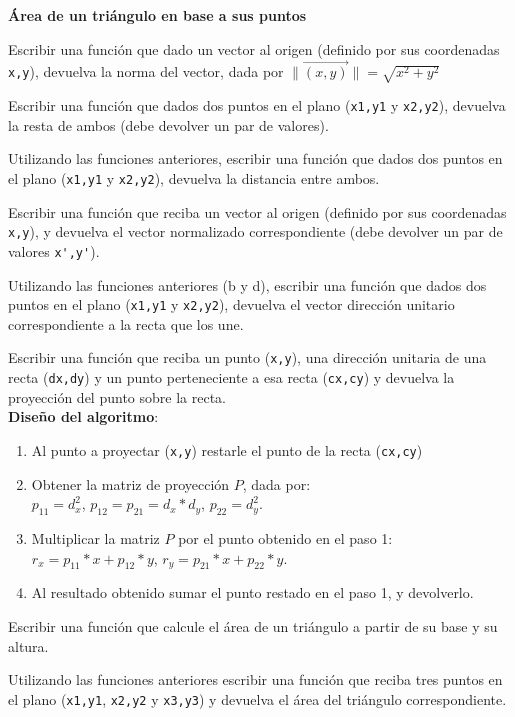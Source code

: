 \begin{ejercicio}
{\bf Área de un triángulo en base a sus puntos}
\begin{partes}

    \item Escribir una función que dado un vector al origen (definido por sus
 coordenadas \verb!x,y!), devuelva la norma del vector, dada por
 $\lVert\vec{(x,y)}\rVert=\sqrt{x^2+y^2}$

    \item Escribir una función que dados dos puntos en el plano (\verb!x1,y1! y
 \verb!x2,y2!), devuelva la resta de ambos (debe devolver un par de
 valores).

    \item Utilizando las funciones anteriores, escribir una función que dados dos
 puntos en el plano (\verb!x1,y1! y \verb!x2,y2!), devuelva la distancia
 entre ambos.

    \item Escribir una función que reciba un vector al origen (definido por sus
 coordenadas \verb!x,y!), y devuelva el vector normalizado correspondiente (debe
 devolver un par de valores \verb!x',y'!).

    \item Utilizando las funciones anteriores (b y d), escribir una función que
 dados dos puntos en el plano (\verb!x1,y1! y \verb!x2,y2!), devuelva el
 vector dirección unitario correspondiente a la recta que los une.

    \item Escribir una función que reciba un punto (\verb!x,y!), una dirección
 unitaria de una recta (\verb!dx,dy!) y un punto perteneciente a esa recta
 (\verb!cx,cy!) y devuelva la proyección del punto sobre la recta. \\
 {\bf Diseño del algoritmo}:
 \begin{enumerate}
     \setlength{\itemsep}{0pt}
     \setlength{\parsep}{0pt}
     \item Al punto a proyectar (\verb!x,y!) restarle el punto de la recta
 (\verb!cx,cy!)
     \item Obtener la matriz de proyección $P$, dada por:  \\
 $p_{11} = d_x^2$,  $p_{12} = p_{21} = d_x*d_y$, $p_{22} = d_y^2$.
     \item Multiplicar la matriz $P$ por el punto obtenido en el paso 1: \\
 $r_x = p_{11} * x + p_12 * y$, $r_y = p_{21} * x + p_{22} * y$.
     \item Al resultado obtenido sumar el punto restado en el paso 1, y
 devolverlo.
 \end{enumerate}

    \item Escribir una función que calcule el área de un triángulo a partir de
 su base y su altura.

    \item Utilizando las funciones anteriores escribir una función que reciba
 tres puntos en el plano (\verb!x1,y1!, \verb!x2,y2! y \verb!x3,y3!) y
 devuelva el área del triángulo correspondiente.
\end{partes}
\end{ejercicio}

